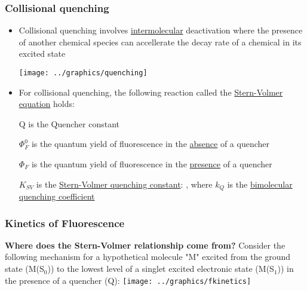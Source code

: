\documentclass[ignorenonframetext]{beamer}
\begin{document}
\begin{frame}
\frametitle{Collisional quenching}
 {
\begin{itemize}
\item<1-2> Collisional quenching involves \underline{intermolecular} deactivation where the presence of another chemical species can accellerate the decay rate of a chemical in its excited state\\
\begin{center} \texttt{[image: ../graphics/quenching]} \end{center}
\item<2> For collisional quenching, the following reaction called the \underline{Stern-Volmer equation} holds: 
\end{itemize} }
 {
\centering {}
\begin{itemize}
\item [Q] is the Quencher constant 
\item [\(\Phi^0_F\)] is the quantum yield of fluorescence in the \underline{absence} of a quencher
\item [\(\Phi_F\)] is the quantum yield of fluorescence in the \underline{presence} of a quencher
\item [\(K_{SV}\)] is the \underline{Stern-Volmer quenching constant}: , \enspace where \(k_Q\) is the \underline{bimolecular quenching coefficient}
\end{itemize}
}
\end{frame}

\begin{frame}[t]
\frametitle{Kinetics of Fluorescence}
\textbf{Where does the Stern-Volmer relationship come from?}\newline
\textbullet \enspace Consider the following mechanism for a hypothetical molecule "M" excited from the ground state (M(S\(_0\))) to the lowest level of a singlet excited electronic state (M(S\(_1\))) in the presence of a quencher (Q):\newline
{}
\texttt{[image: ../graphics/fkinetics]} 
\small
{}
\end{frame}
\end{document}
